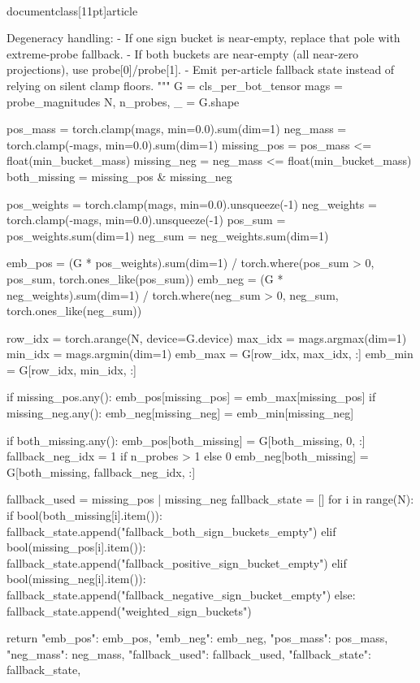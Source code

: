 \\documentclass[11pt]{article}
\begin{document}
\begin{CodeBlock}
    Degeneracy handling:
      - If one sign bucket is near-empty, replace that pole with extreme-probe fallback.
      - If both buckets are near-empty (all near-zero projections), use probe[0]/probe[1].
      - Emit per-article fallback state instead of relying on silent clamp floors.
    """
    G = cls_per_bot_tensor
    mags = probe_magnitudes
    N, n_probes, _ = G.shape

    pos_mass = torch.clamp(mags, min=0.0).sum(dim=1)
    neg_mass = torch.clamp(-mags, min=0.0).sum(dim=1)
    missing_pos = pos_mass <= float(min_bucket_mass)
    missing_neg = neg_mass <= float(min_bucket_mass)
    both_missing = missing_pos & missing_neg

    pos_weights = torch.clamp(mags, min=0.0).unsqueeze(-1)
    neg_weights = torch.clamp(-mags, min=0.0).unsqueeze(-1)
    pos_sum = pos_weights.sum(dim=1)
    neg_sum = neg_weights.sum(dim=1)

    emb_pos = (G * pos_weights).sum(dim=1) / torch.where(pos_sum > 0, pos_sum, torch.ones_like(pos_sum))
    emb_neg = (G * neg_weights).sum(dim=1) / torch.where(neg_sum > 0, neg_sum, torch.ones_like(neg_sum))

    row_idx = torch.arange(N, device=G.device)
    max_idx = mags.argmax(dim=1)
    min_idx = mags.argmin(dim=1)
    emb_max = G[row_idx, max_idx, :]
    emb_min = G[row_idx, min_idx, :]

    if missing_pos.any():
        emb_pos[missing_pos] = emb_max[missing_pos]
    if missing_neg.any():
        emb_neg[missing_neg] = emb_min[missing_neg]

    if both_missing.any():
        emb_pos[both_missing] = G[both_missing, 0, :]
        fallback_neg_idx = 1 if n_probes > 1 else 0
        emb_neg[both_missing] = G[both_missing, fallback_neg_idx, :]

    fallback_used = missing_pos | missing_neg
    fallback_state = []
    for i in range(N):
        if bool(both_missing[i].item()):
            fallback_state.append("fallback_both_sign_buckets_empty")
        elif bool(missing_pos[i].item()):
            fallback_state.append("fallback_positive_sign_bucket_empty")
        elif bool(missing_neg[i].item()):
            fallback_state.append("fallback_negative_sign_bucket_empty")
        else:
            fallback_state.append("weighted_sign_buckets")

    return {
        "emb_pos": emb_pos,
        "emb_neg": emb_neg,
        "pos_mass": pos_mass,
        "neg_mass": neg_mass,
        "fallback_used": fallback_used,
        "fallback_state": fallback_state,
    }



\end{CodeBlock}
\end{document}

